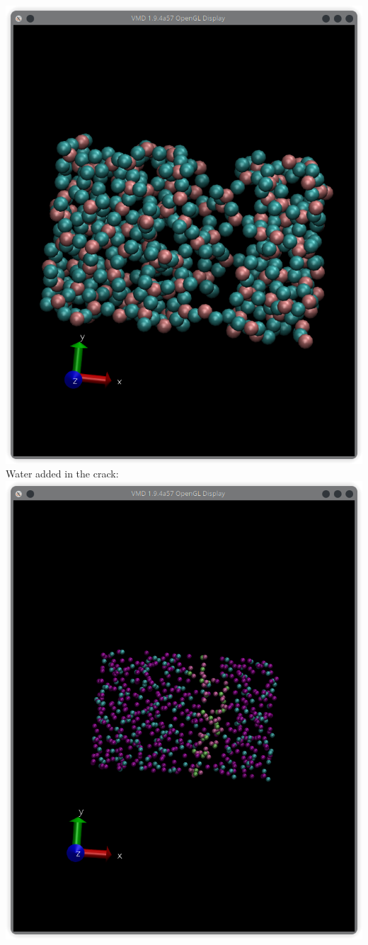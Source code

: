\documentclass[11pt]{article}
\begin{document}
\includegraphics[scale=0.5]{Q3b_LF_Crack.png}\\
Water added in the crack:\\
\includegraphics[scale=0.5]{Q3b_LF_Crackfill.png}\\
\end{document}
